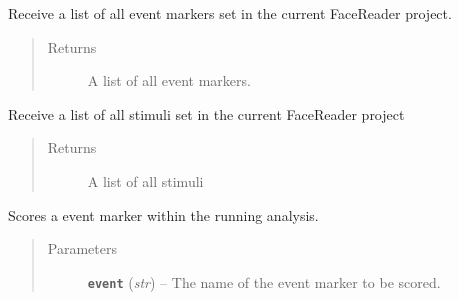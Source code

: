 \documentclass[letterpaper,10pt,english]{sphinxmanual}
\begin{document}
\begin{fulllineitems}
\begin{fulllineitems}
\end{fulllineitems}


\begin{fulllineitems}
\label{_static/facereader:FaceReader.FaceReader.get_events}
Receive a list of all event markers set in the current FaceReader project.
\begin{quote}\begin{description}
\item[{Returns}] \leavevmode
A list of all event markers.

\end{description}\end{quote}

\end{fulllineitems}


\begin{fulllineitems}
\label{_static/facereader:FaceReader.FaceReader.get_stimuli}
Receive a list of all stimuli set in the current FaceReader project
\begin{quote}\begin{description}
\item[{Returns}] \leavevmode
A list of all stimuli

\end{description}\end{quote}

\end{fulllineitems}


\begin{fulllineitems}
\label{_static/facereader:FaceReader.FaceReader.score_event}
Scores a event marker within the running analysis.
\begin{quote}\begin{description}
\item[{Parameters}] \leavevmode
\textbf{\texttt{event}} (\emph{str}) -- The name of the event marker to be scored.

\end{description}\end{quote}


\end{fulllineitems}
\end{fulllineitems}
\end{document}
